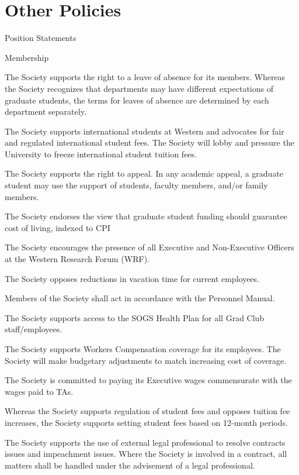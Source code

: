 \section{Other Policies}
\begin{longenum}[label*=\thesection.\arabic*., align=left]
\item Position Statements
\begin{longenum}[label*=\arabic*., align=left]
\item Membership
\begin{longenum}[label*=\arabic*., align=left]
\item The Society supports the right to a leave of absence for its members. Whereas the Society recognizes that departments may have different expectations of graduate students, the terms for leaves of absence are determined by each department separately.
\item The Society supports international students at Western and advocates for fair and regulated international student fees. The Society will lobby and pressure the University to freeze international student tuition fees.
\item The Society supports the right to appeal. In any academic appeal, a graduate student may use the support of students, faculty members, and/or family members.
\item The Society endorses the view that graduate student funding should guarantee cost of living, indexed to CPI
\item The Society encourages the presence of all Executive and Non-Executive Officers at the Western Research Forum (WRF).
\item The Society opposes reductions in vacation time for current employees.
\item Members of the Society shall act in accordance with the Personnel Manual.
\item The Society supports access to the SOGS Health Plan for all Grad Club staff/employees.
\item The Society supports Workers Compensation coverage for its employees. The Society will make budgetary adjustments to match increasing cost of coverage.
\item The Society is committed to paying its Executive wages commensurate with the wages paid to TAs.
\item Whereas the Society supports regulation of student fees and opposes tuition fee increases, the Society supports setting student fees based on 12-month periods.
\item The Society supports the use of external legal professional to resolve contracts issues and impeachment issues. Where the Society is involved in a contract, all matters shall be handled under the advisement of a legal professional.

\end{longenum}
\end{longenum}
\end{longenum}
